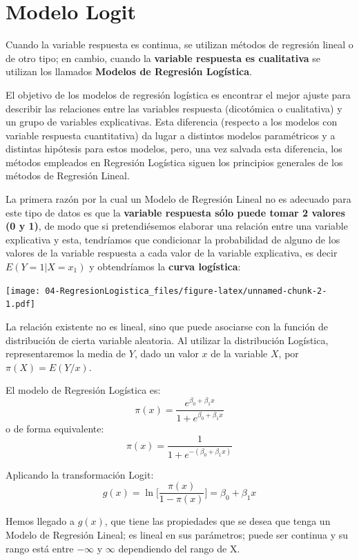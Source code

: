 \documentclass[]{book}
\begin{document}
\hypertarget{modelo-logit}{%
\section{Modelo Logit}\label{modelo-logit}}

Cuando la variable respuesta es continua, se utilizan métodos de regresión lineal o de otro tipo; en cambio, cuando la \textbf{variable respuesta es cualitativa} se utilizan los llamados \textbf{Modelos de Regresión Logística}.

El objetivo de los modelos de regresión logística es encontrar el mejor ajuste para describir las relaciones entre las variables respuesta (dicotómica o cualitativa) y un grupo de variables explicativas. Esta diferencia (respecto a los modelos con variable respuesta cuantitativa) da lugar a distintos modelos paramétricos y a distintas hipótesis para estos modelos, pero, una vez salvada esta diferencia, los métodos empleados en Regresión Logística siguen los principios generales de los métodos de Regresión Lineal.

La primera razón por la cual un Modelo de Regresión Lineal no es adecuado para este tipo de datos es que la \textbf{variable respuesta sólo puede tomar 2 valores (0 y 1)}, de modo que si pretendiésemos elaborar una relación entre una variable explicativa y esta, tendríamos que condicionar la probabilidad de alguno de los valores de la variable respuesta a cada valor de la variable explicativa, es decir
\(E(Y= 1 | X = x_1)\) y obtendríamos la \textbf{curva logística}:

\texttt{[image: 04-RegresionLogistica\_files/figure-latex/unnamed-chunk-2-1.pdf]}

La relación existente no es lineal, sino que puede asociarse con la función de distribución de cierta variable aleatoria. Al utilizar la distribución Logística, representaremos la media de \(Y\), dado un valor \(x\) de la variable \(X\), por \(\pi(X)=E(Y/x)\).

El modelo de Regresión Logística es:
\[
\pi(x) = \frac{e^{\beta_0+\beta_1x}}{1+e^{\beta_0+\beta_1x}}
\]
o de forma equivalente:
\[ \pi(x) = \frac{1}{1 + e^{-(\beta_0 + \beta_1 x)}} \]

Aplicando la transformación Logit:
\[
g(x)=\ln\Big[\frac{\pi(x)}{1-\pi(x)}\Big]= \beta_0+\beta_1x
\]

Hemos llegado a \(g(x)\), que tiene las propiedades que se desea que tenga un Modelo de Regresión Lineal; es lineal en sus parámetros; puede ser continua y su rango está entre \(-\infty\) y \(\infty\) dependiendo del rango de X.
\end{document}
